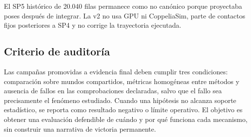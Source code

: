 El SP5 histórico de 20.040 filas permanece como no canónico porque proyectaba poses después de integrar. La v2 no usa GPU ni CoppeliaSim, parte de contactos fijos posteriores a SP4 y no corrige la trayectoria ejecutada.

\subsection*{Criterio de auditoría}

Las campañas promovidas a evidencia final deben cumplir tres condiciones: comparación sobre mundos compartidos, métricas homogéneas entre métodos y ausencia de fallos en las comprobaciones declaradas, salvo que el fallo sea precisamente el fenómeno estudiado. Cuando una hipótesis no alcanza soporte estadístico, se reporta como resultado negativo o límite operativo. El objetivo es obtener una evaluación defendible de cuándo y por qué funciona cada mecanismo, sin construir una narrativa de victoria permanente.
\endgroup
